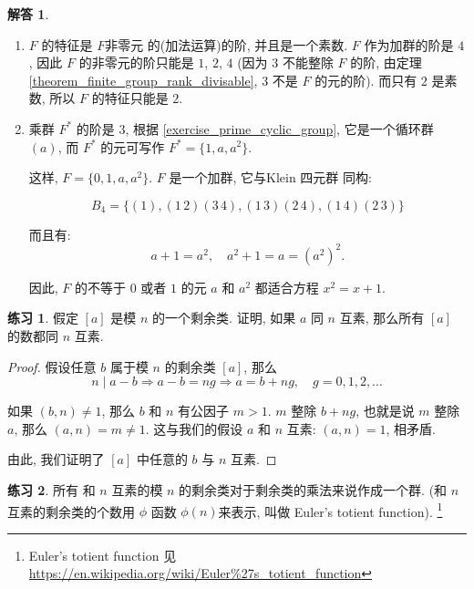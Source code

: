 \documentclass[utf8]{ctexbook}
\theoremstyle{definition}
\newtheorem{exercise}{练习}[section]
\newtheorem*{soln}{解答}
\begin{document}
\begin{soln}
\begin{enumerate}
\item{$F$ 的特征是 $F$非零元 的(加法运算)的阶, 并且是一个素数. $F$ 作为加群的阶是 $4$, 因此 $F$ 的非零元的阶只能是 $1$, $2$, $4$ (因为 $3$ 不能整除 $F$ 的阶, 由定理 \ref{theorem_finite_group_rank_divisable}, $3$ 不是 $F$ 的元的阶). 而只有 $2$ 是素数, 所以 $F$ 的特征只能是 $2$.}
\item{乘群 $F^*$ 的阶是 $3$, 根据  \ref{exercise_prime_cyclic_group}, 它是一个循环群 $(a)$, 而 $F^*$ 的元可写作 $F^* = \{1, a, a^2 \}$.

这样, $F = \{0, 1, a, a^2 \}$. $F$ 是一个加群, 它与Klein 四元群 同构:

$$B_4 = \{ (1), (1\, 2)(3 \, 4), (1\, 3)(2 \, 4), (1\, 4) (2 \, 3) \} $$

而且有:
\begin{equation}
a + 1 = a^2, \quad a^2 + 1 = a = (a^2)^2.
\end{equation}

因此, $F$ 的不等于 $0$ 或者 $1$ 的元 $a$ 和 $a^2$ 都适合方程 $x^2 = x+ 1 $. 
}
\end{enumerate}
\end{soln}


\begin{exercise}
假定 $[a]$ 是模 $n$ 的一个剩余类. 证明, 如果 $a$ 同 $n$ 互素, 那么所有 $[a]$ 的数都同 $n$ 互素.
\end{exercise}

\begin{proof}
假设任意 $b$ 属于模 $n$ 的剩余类 $[a]$, 那么
\begin{equation}
n \mid a - b \Rightarrow  a - b = n g \Rightarrow a = b + n g , \quad g = 0, 1, 2, \ldots
\end{equation}

如果 $(b, n) \neq 1$, 那么 $b$ 和 $n$ 有公因子 $m > 1 $. $m$ 整除 $b +ng$, 也就是说 $m$ 整除 $a$, 那么 $(a, n ) = m \neq 1$. 这与我们的假设 $a$ 和 $n$ 互素: $(a,n) = 1$, 相矛盾. 

由此, 我们证明了 $[a]$ 中任意的 $b$ 与 $n$ 互素.

\end{proof}


\begin{exercise}\label{memo_euler_toient_function}
所有 和 $n$ 互素的模 $n$ 的剩余类对于剩余类的乘法来说作成一个群. (和 $n$ 互素的剩余类的个数用 $\phi$ 函数 $ \phi (n) $来表示, 叫做 Euler's totient function). \footnote{Euler's totient function 见 \url{https://en.wikipedia.org/wiki/Euler\%27s\_totient\_function}}
\end{exercise}
\end{document}
